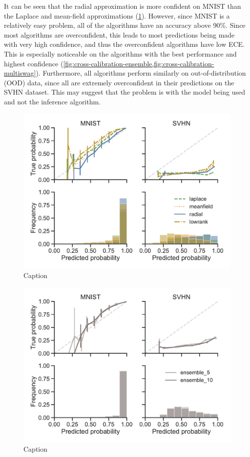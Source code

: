 \documentclass[10pt,a4paper,twocolumn]{article}
\begin{document}
It can be seen that the radial approximation is more confident on MNIST than the Laplace and mean-field approximations (\cref{fig:cross-calibration}).
However, since MNIST is a relatively easy problem, all of the algorithms have an accuracy above 90\%.
Since most algorithms are overconfident, this leads to most predictions being made with very high confidence, and thus the overconfident algorithms have low ECE.
This is especially noticeable on the algorithms with the best performance and highest confidence (\cref{fig:cross-calibration-ensemble,fig:cross-calibration-multiswag}).
Furthermore, all algorithms perform similarly on out-of-distribution (OOD) data, since all are extremely overconfident in their predictions on the SVHN dataset.
This may suggest that the problem is with the model being used and not the inference algorithm.
%
\begin{figure}
    \centering
    \includegraphics[width=\linewidth]{figures/MnistVI.pdf}
    \caption{Caption}
    \label{fig:cross-calibration}
\end{figure}
\begin{figure}
    \centering
    \includegraphics[width=\linewidth]{figures/MnistEnsembles.pdf}
    \caption{Caption}
    \label{fig:cross-calibration-ensemble}
\end{figure}
\end{document}
